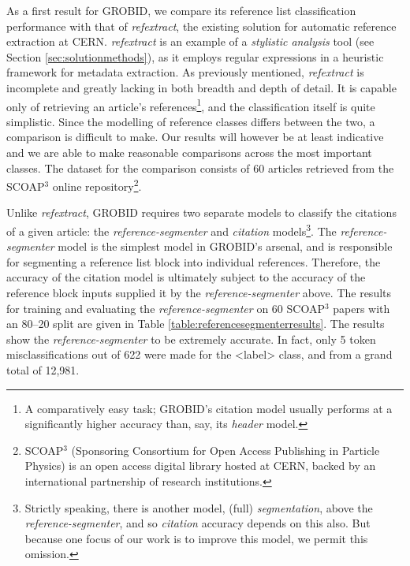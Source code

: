 As a first result for GROBID, we compare its reference list classification performance with that of \emph{refextract}, the existing solution for automatic reference extraction at CERN. \emph{refextract} is an example of a \emph{stylistic analysis} tool (see Section \ref{sec:solutionmethods}), as it employs regular expressions in a heuristic framework for metadata extraction. As previously mentioned, \emph{refextract} is incomplete and greatly lacking in both breadth and depth of detail. It is capable only of retrieving an article's references\footnote{A comparatively easy task; GROBID's citation model usually performs at a significantly higher accuracy than, say, its \emph{header} model.}, and the classification itself is quite simplistic. Since the modelling of reference classes differs between the two, a comparison is difficult to make. Our results will however be at least indicative and we are able to make reasonable comparisons across the most important classes. The dataset for the comparison consists of 60 articles retrieved from the SCOAP$^3$ online repository\footnote{SCOAP$^3$ (Sponsoring Consortium for Open Access Publishing in Particle Physics) is an open access digital library hosted at CERN, backed by an international partnership of research institutions.}.

Unlike \emph{refextract}, GROBID requires two separate models to classify the citations of a given article: the \emph{reference-segmenter} and \emph{citation} models\footnote{Strictly speaking, there is another model, (full) \emph{segmentation}, above the \emph{reference-segmenter}, and so \emph{citation} accuracy depends on this also. But because one focus of our work is to improve this model, we permit this omission.}. The \emph{reference-segmenter} model is the simplest model in GROBID's arsenal, and is responsible for segmenting a reference list block into individual references. Therefore, the accuracy of the citation model is ultimately subject to the accuracy of the reference block inputs supplied it by the \emph{reference-segmenter} above. The results for training and evaluating the \emph{reference-segmenter} on 60 SCOAP$^3$ papers with an 80--20 split are given in Table \ref{table:referencesegmenterresults}. The results show the \emph{reference-segmenter} to be extremely accurate. In fact, only 5 token misclassifications out of 622 were made for the <label> class, and from a grand total of 12,981.

